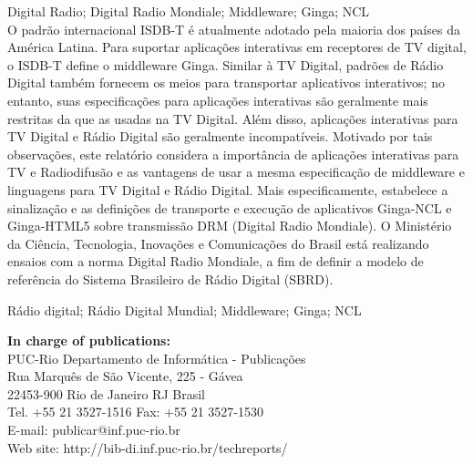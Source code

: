 \documentclass[11pt]{article}
\begin{document}
\medskip

 Digital Radio; Digital Radio Mondiale; Middleware; Ginga; NCL \\

\bigskip
{} O padrão internacional ISDB-T é atualmente adotado pela maioria
dos países
da América Latina. Para suportar aplicações interativas em receptores de
TV digital, o ISDB-T
define o middleware Ginga. Similar à TV Digital, padrões de Rádio Digital
também fornecem os meios para transportar aplicativos interativos; no
entanto, suas especificações
para aplicações interativas são geralmente mais restritas da que as
usadas na TV
Digital. Além disso, aplicações interativas para TV Digital e Rádio
Digital são geralmente
incompatíveis. Motivado por tais observações, este relatório considera a
importância de
aplicações interativas para TV e Radiodifusão e as vantagens de usar a
mesma especificação
de middleware e linguagens para TV Digital e Rádio Digital. Mais
especificamente, estabelece
a sinalização e as definições de transporte e execução de aplicativos
Ginga-NCL e
Ginga-HTML5 sobre transmissão DRM (Digital Radio Mondiale). O Ministério
da Ciência,
Tecnologia, Inovações e Comunicações do Brasil está realizando ensaios
com a norma Digital
Radio Mondiale, a fim de definir a modelo de referência do Sistema
Brasileiro de Rádio
Digital (SBRD).

\medskip
\medskip

 Rádio digital; Rádio Digital Mundial; Middleware; Ginga; NCL \\

\newpage
{} \setcounter{page}{2}
\vspace*{\fill}
\begin{flushleft}
    \textbf{In charge of publications:} \\
    PUC-Rio Departamento de Informática - Publicações \\
    Rua Marquês de São Vicente, 225 - Gávea \\
    22453-900 Rio de Janeiro RJ Brasil \\
    Tel. +55 21 3527-1516 Fax: +55 21 3527-1530 \\
    E-mail: publicar@inf.puc-rio.br \\
    Web site: http://bib-di.inf.puc-rio.br/techreports/ \\
    \end{flushleft}
\end{document}
